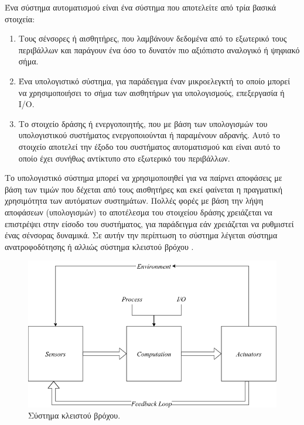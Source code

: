 Ένα σύστημα αυτοματισμού είναι ένα σύστημα που αποτελείτε από τρία
βασικά στοιχεία:

\begin{enumerate}
\item Τους σένσορες ή αισθητήρες, που λαμβάνουν δεδομένα από το
εξωτερικό τους περιβάλλων και παράγουν ένα όσο το δυνατόν πιο
αξιόπιστο αναλογικό ή ψηφιακό σήμα.
\item Ένα υπολογιστικό σύστημα, για παράδειγμα έναν μικροελεγκτή το
οποίο μπορεί να χρησιμοποιήσει το σήμα των αισθητήρων για
υπολογισμούς, επεξεργασία ή I/O.
\item Το στοιχείο δράσης ή ενεργοποιητής, που με βάση των υπολογισμών
του υπολογιστικού συστήματος ενεργοποιούνται ή παραμένουν
αδρανής. Αυτό το στοιχείο αποτελεί την έξοδο του συστήματος
αυτοματισμού και είναι αυτό το οποίο έχει συνήθως αντίκτυπο στο
εξωτερικό του περιβάλλων.
\end{enumerate}

Το υπολογιστικό σύστημα μπορεί να χρησιμοποιηθεί για να παίρνει
αποφάσεις με βάση των τιμών που δέχεται από τους αισθητήρες και εκεί
φαίνεται η πραγματική χρησιμότητα των αυτόματων συστημάτων. Πολλές
φορές με βάση την λήψη αποφάσεων (υπολογισμών) το αποτέλεσμα του
στοιχείου δράσης χρειάζεται να επιστρέψει στην είσοδο του συστήματος,
για παράδειγμα εάν χρειάζεται να ρυθμιστεί ένας σένσορας δυναμικά. Σε
αυτήν την περίπτωση το σύστημα λέγεται σύστημα ανατροφοδότησης ή
αλλιώς σύστημα κλειστού βρόχου .

\begin{figure}[h!]
\centering
\includegraphics[scale=0.4]{images/introduction/as_feedback.png}
\caption{Σύστημα κλειστού βρόχου.}
 \label{fig:as_feedback}
\end{figure}

